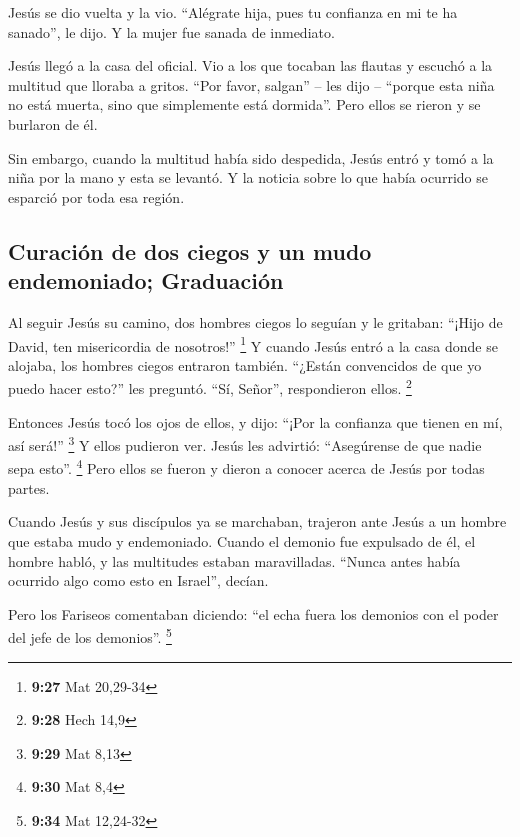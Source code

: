  Jesús se dio vuelta y la vio. ``Alégrate hija, pues tu
confianza en mi te ha sanado'', le dijo. Y la mujer fue sanada de
inmediato.

 Jesús llegó a la casa del oficial. Vio a los que tocaban
las flautas y escuchó a la multitud que lloraba a gritos.
 ``Por favor, salgan'' -- les dijo -- ``porque esta niña
no está muerta, sino que simplemente está dormida''. Pero ellos se
rieron y se burlaron de él.

 Sin embargo, cuando la multitud había sido despedida,
Jesús entró y tomó a la niña por la mano y esta se levantó.
 Y la noticia sobre lo que había ocurrido se esparció por
toda esa región.

\hypertarget{curaciuxf3n-de-dos-ciegos-y-un-mudo-endemoniado-graduaciuxf3n}{%
\subsection{Curación de dos ciegos y un mudo endemoniado;
Graduación}\label{curaciuxf3n-de-dos-ciegos-y-un-mudo-endemoniado-graduaciuxf3n}}

 Al seguir Jesús su camino, dos hombres ciegos lo seguían
y le gritaban: ``¡Hijo de David, ten misericordia de nosotros!''
\footnote{\textbf{9:27} Mat 20,29-34}  Y cuando Jesús
entró a la casa donde se alojaba, los hombres ciegos entraron también.
``¿Están convencidos de que yo puedo hacer esto?'' les preguntó. ``Sí,
Señor'', respondieron ellos. \footnote{\textbf{9:28} Hech 14,9}

 Entonces Jesús tocó los ojos de ellos, y dijo: ``¡Por la
confianza que tienen en mí, así será!'' \footnote{\textbf{9:29} Mat 8,13}
 Y ellos pudieron ver. Jesús les advirtió: ``Asegúrense
de que nadie sepa esto''. \footnote{\textbf{9:30} Mat 8,4}
 Pero ellos se fueron y dieron a conocer acerca de Jesús
por todas partes.

 Cuando Jesús y sus discípulos ya se marchaban, trajeron
ante Jesús a un hombre que estaba mudo y endemoniado. 
Cuando el demonio fue expulsado de él, el hombre habló, y las multitudes
estaban maravilladas. ``Nunca antes había ocurrido algo como esto en
Israel'', decían.

 Pero los Fariseos comentaban diciendo: ``el echa fuera
los demonios con el poder del jefe de los demonios''. \footnote{\textbf{9:34}
  Mat 12,24-32}

